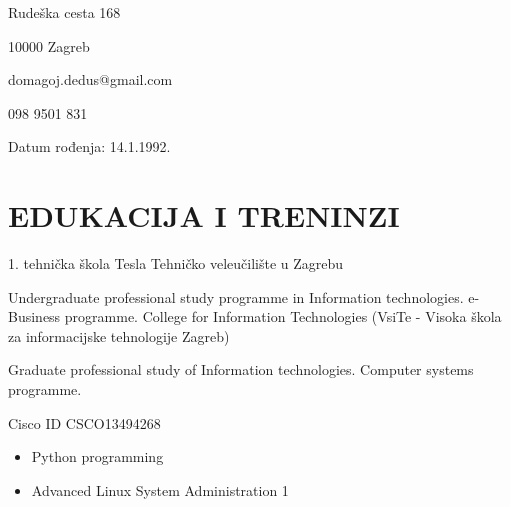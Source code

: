 \documentclass{cv}
\begin{document}

Rudeška cesta 168

10000 Zagreb

domagoj.dedus@gmail.com

098 9501 831

Datum rođenja: 14.1.1992.
\section{EDUKACIJA I TRENINZI}
1. tehnička škola Tesla
Tehničko veleučilište u Zagrebu

Undergraduate professional study programme in Information technologies. e-Business programme.
College for Information Technologies (VsiTe - Visoka škola za informacijske tehnologije Zagreb)

Graduate professional study of Information technologies. Computer systems programme.

Cisco ID CSCO13494268
\begin{itemize}
    \setlength\itemsep{0.1cm}
    \item Python programming
    \item Advanced Linux System Administration 1
\end{itemize}
\end{document}
